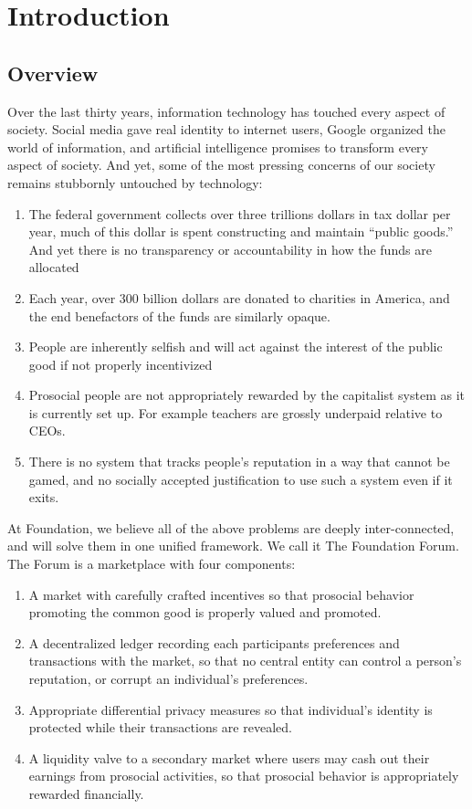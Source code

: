 \section{\textbf{Introduction}}

\subsection{Overview}

Over the last thirty years, information technology has touched every aspect of society. Social media gave real identity to internet users, Google organized the world of information, and artificial intelligence promises to transform every aspect of society. And yet, some of the most pressing concerns of our society remains stubbornly untouched by technology:

\begin{enumerate}
	\item The federal government collects over three trillions dollars in tax dollar per year, much of this dollar is spent constructing and maintain “public goods.” And yet there is no transparency or accountability in how the funds are allocated
	\item Each year, over 300 billion dollars are donated to charities in America, and the end benefactors of the funds are similarly opaque. 
	\item People are inherently selfish and will act against the interest of the public good if not properly incentivized
	\item Prosocial people are not appropriately rewarded by the capitalist system as it is currently set up. For example teachers are grossly underpaid relative to CEOs.
	\item There is no system that tracks people’s reputation in a way that cannot be gamed, and no socially accepted justification to use such a system even if it exits.
\end{enumerate}


At Foundation, we believe all of the above problems are deeply inter-connected, and will solve them in one unified framework. We call it The Foundation Forum. The Forum is a marketplace with four components:

\begin{enumerate}
	\item A market with carefully crafted incentives so that prosocial behavior promoting the common good is properly valued and promoted.
	\item A decentralized ledger recording each participants preferences and transactions with the market, so that no central entity can control a person’s reputation, or corrupt an individual’s preferences. 
	\item Appropriate differential privacy measures so that individual’s identity is protected while their transactions are revealed.
	\item A liquidity valve to a secondary market where users may cash out their earnings from prosocial activities, so that prosocial behavior is appropriately rewarded financially.  
\end{enumerate}


